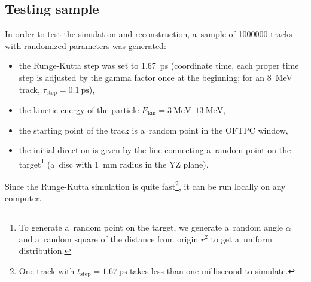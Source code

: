 		\subsection{Testing sample}
		\label{sec:rktest}		
		In order to test the simulation and reconstruction, a~sample of \num{1000000} tracks with randomized parameters was generated:
		\begin{itemize}[topsep=4pt,itemsep=2pt]
			\item the Runge-Kutta step was set to \qty{1.67}{\ps} (coordinate time, each proper time step is adjusted by the gamma factor once at the beginning; for an \qty{8}{\MeV} track, $\tau_\text{step} = \qty{0.1}{\ps}$),
			\item the kinetic energy of the particle $E_\text{kin} = \qtyrange{3}{13}{\MeV}$,
			\item the starting point of the track is a~random point in the \ac{OFTPC} window,
			\item the initial direction is given by the line connecting a~random point on the target\footnote{To generate a~random point on the target, we generate a~random angle $\alpha$ and a~random square of the distance from origin $r^2$ to get a~uniform distribution.} (a~disc with 1~mm radius in the YZ plane).
		\end{itemize}
		Since the Runge-Kutta simulation is quite fast\footnote{One track with $t_\text{step} = \qty{1.67}{\ps}$ takes less than one millisecond to simulate.}, it can be run locally on any computer.